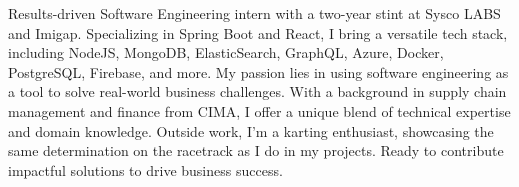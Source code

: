 \begin{cvparagraph}

    Results-driven Software Engineering intern with a two-year stint at Sysco LABS and Imigap. Specializing in Spring Boot and React, I bring a versatile tech stack, including NodeJS, MongoDB, ElasticSearch, GraphQL, Azure, Docker, PostgreSQL, Firebase, and more. My passion lies in using software engineering as a tool to solve real-world business challenges. With a background in supply chain management and finance from CIMA, I offer a unique blend of technical expertise and domain knowledge. Outside work, I'm a karting enthusiast, showcasing the same determination on the racetrack as I do in my projects. Ready to contribute impactful solutions to drive business success.

\end{cvparagraph}